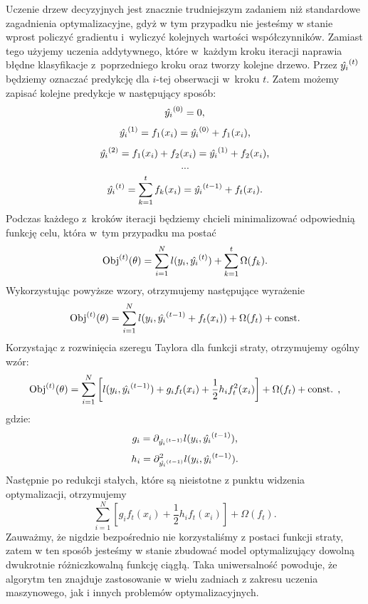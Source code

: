 \documentclass[inzynierska]{pwr_wmat_praca_dyplomowa}
\theoremstyle{plain}
\numberwithin{theorem}{chapter}
\theoremstyle{definition}
\numberwithin{theorem}{chapter}
\begin{document}
Uczenie drzew decyzyjnych jest znacznie trudniejszym zadaniem niż standardowe zagadnienia optymalizacyjne, gdyż w tym przypadku nie jesteśmy w stanie wprost policzyć gradientu i~wyliczyć kolejnych wartości współczynników. Zamiast tego użyjemy uczenia addytywnego, które w~każdym kroku iteracji naprawia błędne klasyfikacje z~poprzedniego kroku oraz tworzy kolejne drzewo. Przez $\hat{y_i}^{(t)}$ będziemy oznaczać predykcję dla $i$-tej obserwacji w~kroku $t$. Zatem możemy zapisać kolejne predykcje w następujący sposób:
$$ \hat{y_i}^{(0)} = 0 \text{,}$$
$$ \hat{y_i}^{(1)} = f_1(x_i)  = \hat{y_i}^{(0)} + f_1(x_i) \text{,}$$
$$ \hat{y_i}^{(2)} = f_1(x_i) + f_2(x_i) = \hat{y_i}^{(1)} + f_2(x_i) \text{,}$$
$$ ... $$
$$ \hat{y_i}^{(t)} = \sum_{k=1}^{t} f_k(x_i) = \hat{y_i}^{(t-1)} + f_t(x_i) \text{.}$$
Podczas każdego z~kroków iteracji będziemy chcieli minimalizować odpowiednią funkcję celu, która w~tym przypadku ma postać
$$ \text{Obj}^{(t)}(\theta) = \sum_{i=1}^{N} l(y_i, \hat{y_i}^{(t)}) + \sum_{k=1}^{t} \Omega(f_k) \text{.} $$
Wykorzystując powyższe wzory, otrzymujemy następujące wyrażenie
$$ \text{Obj}^{(t)}(\theta) = \sum_{i=1}^{N} l(y_i, \hat{y_i}^{(t-1)} + f_t(x_i)) + \Omega(f_t) + \text{const.}$$
Korzystając z rozwinięcia szeregu Taylora dla funkcji straty, otrzymujemy ogólny wzór:
$$ \text{Obj}^{(t)}(\theta) = \sum_{i=1}^{N} \left[ l(y_i, \hat{y_i}^{(t-1)}) + g_i f_t(x_i) + \frac{1}{2} h_i f_t^2(x_i) \right] + \Omega(f_t) + \text{const. ,} $$
gdzie:
$$ g_i = \partial_{\hat{y_i}^{(t-1)}} l(y_i, \hat{y_i}^{(t-1)}) \text{,} $$
$$ h_i = \partial^2_{\hat{y_i}^{(t-1)}} l(y_i, \hat{y_i}^{(t-1)}) \text{.}$$
Następnie po redukcji stałych, które są nieistotne z punktu widzenia optymalizacji, otrzymujemy
$$ \sum_{i=1}^{N} [g_i f_t(x_i) + \frac{1}{2} h_i f_t(x_i)] + \Omega(f_t) \text{.}$$
Zauważmy, że nigdzie bezpośrednio nie korzystaliśmy z postaci funkcji straty, zatem w ten sposób jesteśmy w stanie zbudować model optymalizujący dowolną dwukrotnie różniczkowalną funkcję ciągłą. Taka uniwersalność powoduje, że algorytm ten znajduje zastosowanie w wielu zadniach z zakresu uczenia maszynowego, jak i innych problemów optymalizacyjnych.
\end{document}
